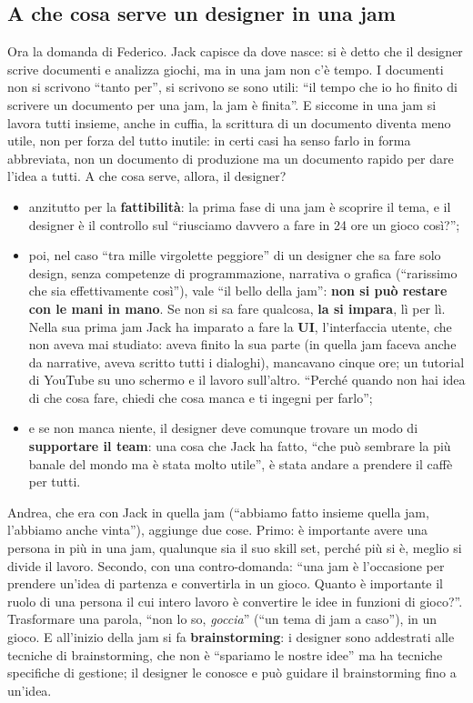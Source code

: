 \subsection{A che cosa serve un designer in una jam}

Ora la domanda di Federico. Jack capisce da dove nasce: si è detto che il
designer scrive documenti e analizza giochi, ma in una jam non c'è tempo.
I documenti non si scrivono ``tanto per'', si scrivono se sono utili: ``il
tempo che io ho finito di scrivere un documento per una jam, la jam è
finita''. E siccome in una jam si lavora tutti insieme, anche in cuffia, la
scrittura di un documento diventa meno utile, non per forza del tutto
inutile: in certi casi ha senso farlo in forma abbreviata, non un documento
di produzione ma un documento rapido per dare l'idea a tutti. A che cosa
serve, allora, il designer?
\begin{itemize}
  \item anzitutto per la \textbf{fattibilità}: la prima fase di una jam è
        scoprire il tema, e il designer è il controllo sul ``riusciamo
        davvero a fare in 24 ore un gioco così?'';
  \item poi, nel caso ``tra mille virgolette peggiore'' di un designer che
        sa fare solo design, senza competenze di programmazione, narrativa o
        grafica (``rarissimo che sia effettivamente così''), vale ``il bello
        della jam'': \textbf{non si può restare con le mani in mano}. Se non
        si sa fare qualcosa, \textbf{la si impara}, lì per lì. Nella sua
        prima jam Jack ha imparato a fare la \textbf{UI}, l'interfaccia
        utente, che non aveva mai studiato: aveva finito la sua parte (in
        quella jam faceva anche da narrative, aveva scritto tutti i
        dialoghi), mancavano cinque ore; un tutorial di YouTube su uno
        schermo e il lavoro sull'altro. ``Perché quando non hai idea di che
        cosa fare, chiedi che cosa manca e ti ingegni per farlo'';
  \item e se non manca niente, il designer deve comunque trovare un modo di
        \textbf{supportare il team}: una cosa che Jack ha fatto, ``che può
        sembrare la più banale del mondo ma è stata molto utile'', è stata
        andare a prendere il caffè per tutti.
\end{itemize}

Andrea, che era con Jack in quella jam (``abbiamo fatto insieme quella jam,
l'abbiamo anche vinta''), aggiunge due cose. Primo: è importante avere una
persona in più in una jam, qualunque sia il suo skill set, perché più si è,
meglio si divide il lavoro. Secondo, con una contro-domanda: ``una jam è
l'occasione per prendere un'idea di partenza e convertirla in un gioco.
Quanto è importante il ruolo di una persona il cui intero lavoro è
convertire le idee in funzioni di gioco?''. Trasformare una parola, ``non lo
so, \emph{goccia}'' (``un tema di jam a caso''), in un gioco. E all'inizio
della jam si fa \textbf{brainstorming}: i designer sono addestrati alle
tecniche di brainstorming, che non è ``spariamo le nostre idee'' ma ha
tecniche specifiche di gestione; il designer le conosce e può guidare il
brainstorming fino a un'idea.

